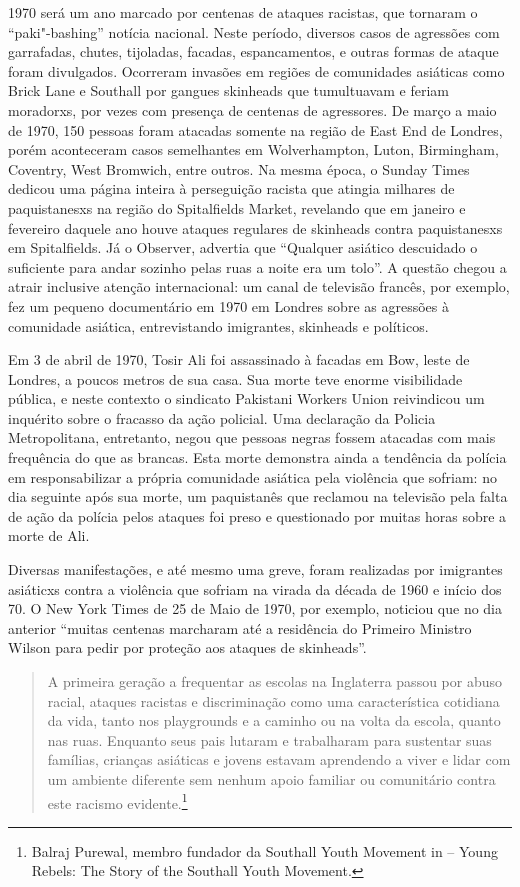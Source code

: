 1970 será um ano marcado por centenas de ataques racistas, que tornaram o ``paki"-bashing'' notícia nacional. Neste período, diversos casos de agressões com garrafadas, chutes, tijoladas, facadas, espancamentos, e outras formas de ataque foram divulgados. Ocorreram invasões em regiões de comunidades asiáticas como Brick Lane e Southall por gangues skinheads que tumultuavam e feriam moradorxs, por vezes com presença de centenas de agressores. De março a maio de 1970, 150 pessoas foram atacadas somente na região de East End de Londres, porém aconteceram casos semelhantes em Wolverhampton, Luton, Birmingham, Coventry, West Bromwich, entre outros. Na mesma época, o Sunday Times dedicou uma página inteira à perseguição racista que atingia milhares de paquistanesxs na região do Spitalfields Market, revelando que em janeiro e fevereiro daquele ano houve ataques regulares de skinheads contra paquistanesxs em Spitalfields. Já o Observer, advertia que ``Qualquer asiático descuidado o suficiente para andar sozinho pelas ruas a noite era um tolo''. A questão chegou a atrair inclusive atenção internacional: um canal de televisão francês, por exemplo, fez um pequeno documentário em 1970 em Londres sobre as agressões à comunidade asiática, entrevistando imigrantes, skinheads e políticos.

Em 3 de abril de 1970, Tosir Ali foi assassinado à facadas em Bow, leste de Londres, a poucos metros de sua casa. Sua morte teve enorme visibilidade pública, e neste contexto o sindicato Pakistani Workers Union reivindicou um inquérito sobre o fracasso da ação policial. Uma declaração da Policia Metropolitana, entretanto, negou que pessoas negras fossem atacadas com mais frequência do que as brancas. Esta morte demonstra ainda a tendência da polícia em responsabilizar a própria comunidade asiática pela violência que sofriam: no dia seguinte após sua morte, um paquistanês que reclamou na televisão pela falta de ação da polícia pelos ataques foi preso e questionado por muitas horas sobre a morte de Ali.

Diversas manifestações, e até mesmo uma greve, foram realizadas por imigrantes asiáticxs contra a violência que sofriam na virada da década de 1960 e início dos 70. O New York Times de 25 de Maio de 1970, por exemplo, noticiou que no dia anterior ``muitas centenas marcharam até a residência do Primeiro Ministro Wilson para pedir por proteção aos ataques de skinheads''.

\begin{quote}
A primeira geração a frequentar as escolas na Inglaterra passou por abuso racial, ataques racistas e discriminação como uma característica cotidiana da vida, tanto nos playgrounds e a caminho ou na volta da escola, quanto nas ruas. Enquanto seus pais lutaram e trabalharam para sustentar suas famílias, crianças asiáticas e jovens estavam aprendendo a viver e lidar com um ambiente diferente sem nenhum apoio familiar ou comunitário contra este racismo evidente.\footnote{Balraj Purewal, membro fundador da Southall Youth Movement in  -- Young Rebels: The Story of the Southall Youth Movement.}
\end{quote}

